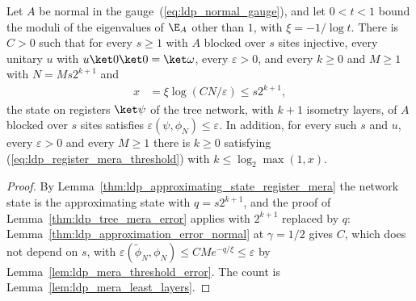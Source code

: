 \begin{lemma}
    \label{thm:ldp_register_mera_error}
    \leanok
    Let $A$ be normal in the gauge~(\ref{eq:ldp_normal_gauge}), and let
    $0<t<1$ bound the moduli of the eigenvalues of $\E_A$ other than $1$,
    with $\xi=-1/\log t$. There is $C>0$ such that for every $s\ge1$ with $A$
    blocked over $s$ sites injective, every unitary $u$ with
    $u\ket0\ket0=\ket\omega$, every $\varepsilon>0$, and every $k\ge0$ and
    $M\ge1$ with $N=Ms2^{k+1}$ and
    \begin{align}
        x & =\xi\log(CN/\varepsilon)\le s2^{k+1},
        \label{eq:ldp_register_mera_threshold}
    \end{align}
    the state on registers $\ket\psi$ of the tree network, with $k+1$
    isometry layers, of $A$ blocked over $s$ sites satisfies
    $\varepsilon(\psi,\phi_N)\le\varepsilon$. In addition, for every such $s$
    and $u$, every $\varepsilon>0$ and every $M\ge1$ there is $k\ge0$
    satisfying (\ref{eq:ldp_register_mera_threshold}) with
    $k\le\log_2\max(1,x)$.
\end{lemma}
\begin{proof}
    \leanok
    By Lemma~\ref{thm:ldp_approximating_state_register_mera} the network
    state is the approximating state with $q=s2^{k+1}$, and the proof of
    Lemma~\ref{thm:ldp_tree_mera_error} applies with $2^{k+1}$ replaced by
    $q$: Lemma~\ref{thm:ldp_approximation_error_normal} at $\gamma=1/2$
    gives $C$, which does not depend on $s$, with
    $\varepsilon(\widetilde\phi_N,\phi_N)\le CMe^{-q/\xi}\le\varepsilon$ by
    Lemma~\ref{lem:ldp_mera_threshold_error}. The count is
    Lemma~\ref{lem:ldp_mera_least_layers}.
\end{proof}

